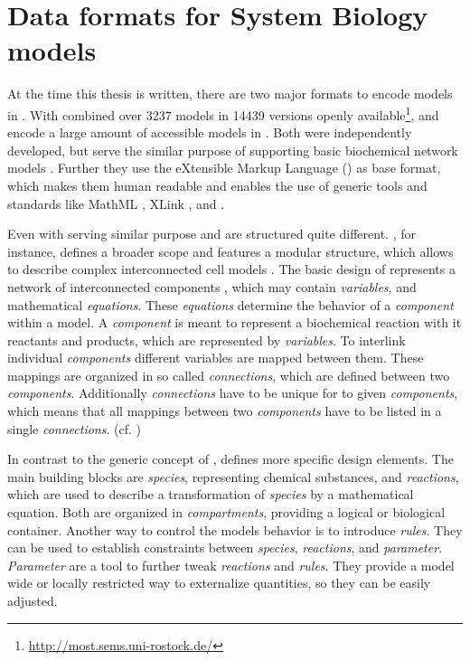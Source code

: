 \section{Data formats for System Biology models}
	\label{sec:background:formats}
	
	At the time this thesis is written, there are two major formats to encode models in \sysbio. With combined over 3237 models in 14439 versions openly available\footnote{\url{http://most.sems.uni-rostock.de/}}, \sbml and \cellml encode a large amount of accessible models in \sysbio.
	Both were independently developed, but serve the similar purpose of supporting basic biochemical network models \citep{Cuellar2003}. Further they use the eXtensible Markup Language \citep{Bray1998} (\xml) as base format, which makes them human readable and enables the use of generic \xml tools and standards \citep{Cuellar2003,Hucka2003} like MathML \citep{Carlisle2003}, XLink \citep{DeRose2010}, and \rdf \citep{Lassila1998}.
	
	Even with serving similar purpose \sbml and \cellml are structured quite different.
	\cellml, for instance, defines a broader scope and features a modular structure, which allows to describe complex interconnected cell models \citep{Cuellar2003}.
	The basic design of \cellml represents a network of interconnected components \citep{Cuellar2003}, which may contain \emph{variables}, and mathematical \emph{equations}. These \emph{equations} determine the behavior of a \emph{component} within a model.
	A \emph{component} is meant to represent a biochemical reaction with it reactants and products, which are represented by \emph{variables}.
	To interlink individual \emph{components} different variables are mapped between them. These mappings are organized in so called \emph{connections}, which are defined between two \emph{components}. Additionally \emph{connections} have to be unique for to given \emph{components}, which means that all mappings between two \emph{components} have to be listed in a single \emph{connections}. (cf. \citet{Cuellar2003})
	
	In contrast to the generic concept of \cellml, \sbml defines more specific design elements.
	The main building blocks are \emph{species}, representing chemical substances, and \emph{reactions}, which are used to describe a transformation of \emph{species} by a mathematical equation. 
	Both are organized in \emph{compartments}, providing a logical or biological container. 
	Another way to control the models behavior is to introduce \emph{rules}. They can be used to establish constraints between \emph{species}, \emph{reactions}, and \emph{parameter}.
	\emph{Parameter} are a tool to further tweak \emph{reactions} and \emph{rules}. They provide a model wide or locally restricted way to externalize quantities, so they can be easily adjusted.
	
